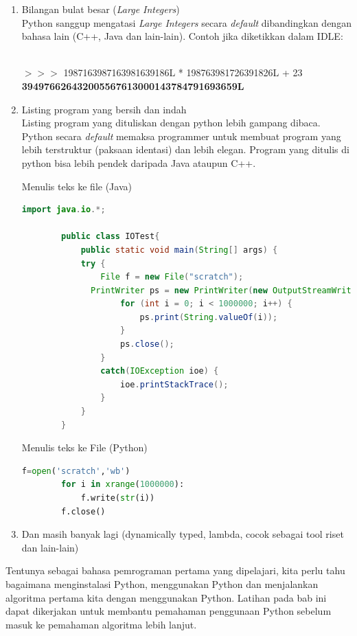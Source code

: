 \begin{enumerate}
	\item Bilangan bulat besar (\textit{Large Integers})
	\\Python sanggup mengatasi \textit{Large Integers} secara \textit{default} dibandingkan dengan bahasa lain (C++, Java dan lain-lain). 
	Contoh jika diketikkan dalam IDLE:
	\begin{IDLE}
	\\$>>>$ 1987163987163981639186L * 198763981726391826L + 23
	\\\textbf{394976626432005567613000143784791693659L}
	\end{IDLE}
	\item Listing program yang bersih dan indah
	\\Listing program yang dituliskan dengan python lebih gampang dibaca. Python secara \textit{default} memaksa programmer untuk membuat program yang lebih terstruktur (paksaan identasi) dan lebih elegan. Program yang ditulis di python bisa lebih pendek daripada Java ataupun C++. 
	 \begin{listprog}{Menulis teks ke file (Java)}
		\label{lst:tulisTeksJava}
		\begin{lstlisting}[language=Java]
		import java.io.*;
		
		public class IOTest{
			public static void main(String[] args) {
		  	try {
		    	File f = new File("scratch");
		      PrintWriter ps = new PrintWriter(new OutputStreamWriter(new FileOutputStream(f)));
					for (int i = 0; i < 1000000; i++) {
						ps.print(String.valueOf(i));
					}
					ps.close();
				}
				catch(IOException ioe) {
					ioe.printStackTrace();
				}
			}
		}
		\end{lstlisting}
	\end{listprog}
	\begin{listprog}{Menulis teks ke File (Python)}
		\label{lst:tulisTeksPython}
		\begin{lstlisting}[language=Python]
		f=open('scratch','wb')
		for i in xrange(1000000):
			f.write(str(i))
		f.close()
		\end{lstlisting}
	\end{listprog}
	\item Dan masih banyak lagi (dynamically typed, lambda, cocok sebagai tool riset dan lain-lain)
\end{enumerate}

Tentunya sebagai bahasa pemrograman pertama yang dipelajari, kita perlu tahu bagaimana menginstalasi Python, menggunakan Python dan menjalankan algoritma pertama kita dengan menggunakan Python. Latihan pada bab ini dapat dikerjakan untuk membantu pemahaman penggunaan Python sebelum masuk ke pemahaman algoritma lebih lanjut. 

